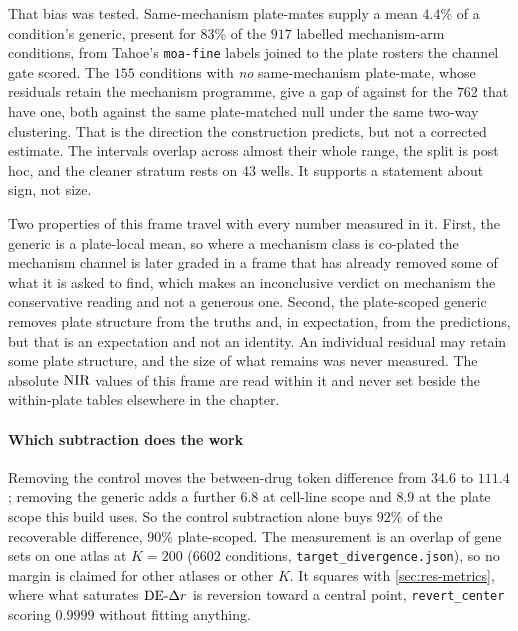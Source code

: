 That bias was tested. Same-mechanism plate-mates supply a mean $4.4\%$ of a
condition's generic, present for $83\%$ of the $\num{917}$ labelled
mechanism-arm conditions, from Tahoe's \texttt{moa-fine} labels joined to the
plate rosters the channel gate scored. The $\num{155}$ conditions with \emph{no}
same-mechanism plate-mate, whose residuals retain the mechanism programme, give a
gap of  against  for
the $\num{762}$ that have one, both against the same plate-matched null under the
same two-way clustering. That is the direction the construction predicts, but not
a corrected estimate. The intervals overlap across almost their whole range, the
split is post hoc, and the cleaner stratum rests on $\num{43}$ wells. It supports
a statement about sign, not size.

\begin{scopelimit}
Two properties of this frame travel with every number measured in it. First, the
generic is a plate-local mean, so where a mechanism class is co-plated the
mechanism channel is later graded in a frame that has already removed some of
what it is asked to find, which makes an inconclusive verdict on mechanism the
conservative reading and not a generous one. Second, the plate-scoped generic
removes plate structure from the truths and, in expectation, from the
predictions, but that is an expectation and not an identity. An individual
residual may retain some plate structure, and the size of what remains was never
measured. The absolute $\textrm{NIR}$ values of this frame are read within it and never
set beside the within-plate tables elsewhere in the chapter.
\end{scopelimit}

\paragraph{Which subtraction does the work} Removing the control moves the
between-drug token difference from $34.6$ to $111.4$; removing the generic adds a
further $6.8$ at cell-line scope and $8.9$ at the plate scope this build uses. So
the control subtraction alone buys $92\%$ of the recoverable difference, $90\%$
plate-scoped. The measurement is an overlap of gene sets on one atlas at $K = 200$
($\num{6602}$ conditions, \texttt{target\_divergence.json}), so no margin is
claimed for other atlases or other $K$. It squares with \cref{sec:res-metrics},
where what saturates $\textrm{DE-}\Delta r$ is reversion toward a central point,
\texttt{revert\_center} scoring $0.9999$ without fitting anything.

